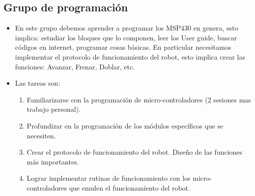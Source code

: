 \documentclass[11pt,letterpaper,spanish]{article}
\begin{document}
\subsection{Grupo de programación}	
\begin{itemize}
\item En este grupo debemos aprender a programar los MSP430 en genera, esto implica: estudiar los bloques que lo componen, leer los User guide, buscar códigos en internet, programar cosas básicas. En particular necesitamos implementar el protocolo de funcionamiento del robot, esto implica crear las funciones: Avanzar, Frenar, Doblar, etc.
\item Las tareas son:
\begin{enumerate}	
\item Familiarizarse con la programación de micro-controladores (2 sesiones mas trabajo personal).
\item Profundizar en la programación de los módulos específicos que se necesiten.
\item Crear el protocolo de funcionamiento del robot. Diseño de las funciones más importantes.
\item Lograr implementar rutinas de funcionamiento con los micro-controladores que emulen el funcionamiento del robot.
\end{enumerate}	
\end{itemize}
\end{document}
